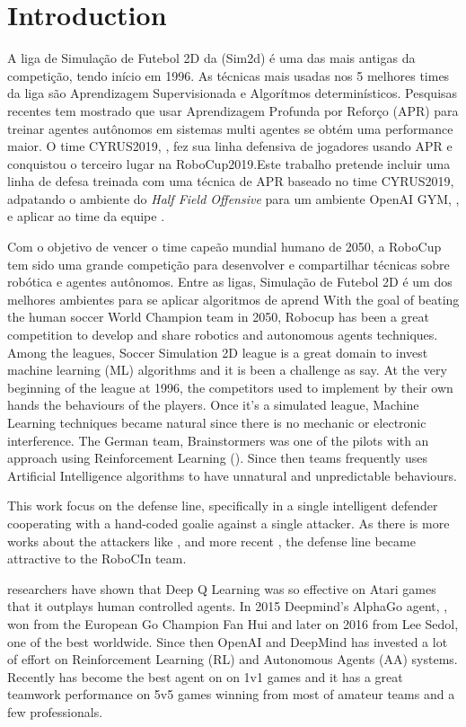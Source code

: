 \chapter{Introduction}
A liga de Simulação de Futebol 2D da \cite{robocup} (Sim2d) é uma das mais antigas da competição, tendo início em 1996. As técnicas mais usadas nos 5 melhores times da liga são Aprendizagem Supervisionada e Algorítmos determinísticos. Pesquisas recentes  tem mostrado que usar Aprendizagem Profunda por Reforço (APR) para treinar agentes autônomos em sistemas multi agentes se obtém uma performance maior. O time CYRUS2019, \cite{cyrus}, fez sua linha defensiva de jogadores usando APR e conquistou o terceiro lugar na RoboCup2019.Este trabalho pretende incluir uma linha de defesa treinada com uma técnica de APR baseado no time CYRUS2019, adpatando o ambiente do \textit{Half Field Offensive} para um ambiente OpenAI GYM, \cite{gym}, e aplicar ao time da equipe \cite{robocin}.

Com o objetivo de vencer o time capeão mundial humano de 2050, a RoboCup tem sido uma grande competição para desenvolver e compartilhar técnicas sobre robótica e agentes autônomos. Entre as ligas, Simulação de Futebol 2D é um dos melhores ambientes para se aplicar algoritmos de aprend
With the goal of beating the human soccer World Champion team in 2050, Robocup has been a great competition to develop and share robotics and autonomous agents techniques. Among the leagues, Soccer Simulation 2D league is a great domain to invest machine learning (ML) algorithms and it is been a challenge as \cite{RoboCupAIChallenge} say. At the very beginning of the league at 1996, the competitors used to implement by their own hands the behaviours of the players. Once it's a simulated league, Machine Learning techniques became natural since there is no mechanic or electronic interference. The German team, Brainstormers was one of the pilots with an approach using Reinforcement Learning (\cite{brainstormers2002}). Since then teams frequently uses Artificial Intelligence algorithms to have unnatural and unpredictable behaviours. 

This work focus on the defense line, specifically in a single intelligent defender cooperating with a hand-coded goalie against a single attacker. As there is more works about the attackers like \cite{passingCrit}, \cite{keepawayRL} and more recent \cite{hausknecht2015deep}, the defense line became attractive to the RoboCIn team.

\cite{deepmind} researchers \cite{dqn} have shown that Deep Q Learning was so effective on Atari games that it outplays human controlled agents. In 2015 Deepmind's AlphaGo agent, \cite{alphago}, won from the European Go Champion Fan Hui and later on 2016 from Lee Sedol, one of the best worldwide. Since then OpenAI and DeepMind has invested a lot of effort on Reinforcement Learning (RL) and Autonomous Agents (AA) systems. Recently \cite{openai5} has become the best agent on \cite{dota2} on 1v1 games and it has a great teamwork performance on 5v5 games winning from most of amateur teams and a few professionals.

